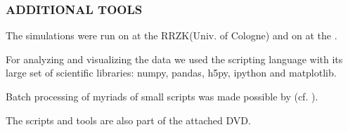 \subsubsection*{ADDITIONAL TOOLS}
The simulations were run on  at the RRZK\footnotemark[1] (Univ. of Cologne)
and on \footnotemark[2] at the .

For analyzing and visualizing the data we used the  scripting
language with its large set of scientific libraries\footnotemark[3]: numpy, pandas, h5py, ipython
and matplotlib.

Batch processing of myriads of small scripts was made possible by  (cf. \cite{Tange2011a}).

The scripts and tools are also part of the attached DVD.

